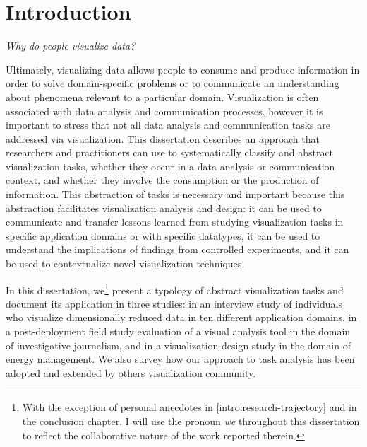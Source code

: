 
\chapter{Introduction}
\label{ch:Introduction}



{\it Why do people visualize data?}

Ultimately, visualizing data allows people to consume and produce information in order to solve domain-specific problems or to communicate an understanding about phenomena relevant to a particular domain.
Visualization is often associated with data analysis and communication processes, however it is important to stress that not all data analysis and communication tasks are addressed via visualization.
This dissertation describes an approach that researchers and practitioners can use to systematically classify and abstract visualization tasks, whether they occur in a data analysis or communication context, and whether they involve the consumption or the production of information.
This abstraction of tasks is necessary and important because this abstraction facilitates visualization analysis and design: it can be used to communicate and transfer lessons learned from studying visualization tasks in specific application domains or with specific datatypes, it can be used to understand the implications of findings from controlled experiments, and it can be used to contextualize novel visualization techniques.

In this dissertation, we\footnote{With the exception of personal anecdotes in \autoref{intro:research-trajectory} and in the conclusion chapter, I will use the pronoun {\it we} throughout this dissertation to reflect the collaborative nature of the work reported therein.} present a typology of abstract visualization tasks and document its application in three studies: in an interview study of individuals who visualize dimensionally reduced data in ten different application domains, in a post-deployment field study evaluation of a visual analysis tool in the domain of investigative journalism, and in a visualization design study in the domain of energy management.
We also survey how our approach to task analysis has been adopted and extended by others visualization community.

